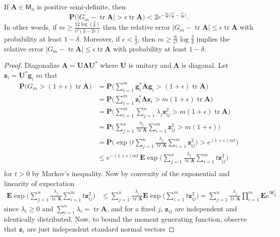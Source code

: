\documentclass[10pt,letterpaper]{siamart171218}
\theoremstyle{definition}
\theoremstyle{remark}
\newcommand\M{\mathsf{M}}
\renewcommand\P{\mathbf{P}}
\newcommand\E{\mathbf{E}}
\newcommand\tr{\operatorname{tr}}
\newcommand\A{\boldsymbol{A}}
\newcommand\U{\boldsymbol{U}}
\renewcommand\L{\boldsymbol{\Lambda}}
\newcommand\z{\boldsymbol{z}}
\newcommand\g{\boldsymbol{g}}
\begin{document}
\begin{theorem}\label{thm:gauss}
    If $\A\in\M_n$ is positive semi-definite, then
    \[
        \P\bigl(|G_m - \tr\A| > \epsilon\tr\A\bigr) < 2e^{-\tfrac{m}{2}\bigl(\tfrac{\epsilon^2}{2} - \tfrac{\epsilon^3}{3}\bigr)}.
    \]
    In other words, if $m \geq \tfrac{12\log(\tfrac{2}{\delta})}{\epsilon^2(3-2\epsilon)}$ then
    the relative error $|G_m - \tr\A| \leq \epsilon\tr\A$ with probability at least $1-\delta$.
    Moreover, if $\epsilon < \tfrac{1}{2}$, then $m \geq \tfrac{6}{\epsilon^2}\log\tfrac{2}{\delta}$
    implies the relative error $|G_m - \tr\A| \leq \epsilon\tr\A$ with probability at least $1-\delta$.
\end{theorem}

\begin{proof}
    Diagonalize $\A = \U\L\U^*$ where $\U$ is unitary and $\L$ is diagonal. Let
    $\z_i = \U^*\g_i$ so that
    \begin{align*}
        \P\bigl(G_m > (1+\epsilon)\tr\A\bigr) &= \P\biggl(\sum_{i=1}^m \g_i^*\A\g_i > (1+\epsilon)\tr\A\biggr)\\
        &= \P\biggl(\sum_{i=1}^m \z_i^* \L\z_i > m(1+\epsilon)\tr\A\biggr)\\
        &= \P\biggl(\sum_{i=1}^m \sum_{j=1}^n \lambda_j \z_{ij}^2 > m(1+\epsilon)\tr\A\biggr)\\
        &= \P\biggl(\sum_{j=1}^n\frac{\lambda_j}{\tr\A}\sum_{i=1}^m \z_{ij}^2 > m(1+\epsilon)\biggr)\\
        &= \P\biggl(\exp\biggl(t\sum_{j=1}^n\frac{\lambda_j}{\tr\A}\sum_{i=1}^m \z_{ij}^2\biggr) > e^{(1+\epsilon)mt}\biggr)\\
        &\leq e^{-(1+\epsilon)mt}\,\E\exp\biggl(\sum_{j=1}^n\frac{\lambda_j}{\tr\A}\sum_{i=1}^m t\z_{ij}^2\biggr)\\
    \end{align*}
    for $t>0$ by Markov's inequality. \citep[Thm\,4.1]{wasserman2013all}
    Now by convexity of the exponential and linearity of expectation
    \begin{align*}
        \E\exp\biggl(\sum_{j=1}^n\frac{\lambda_j}{\tr\A}\sum_{i=1}^m t\z_{ij}^2\biggr) &\leq \sum_{j=1}^n \frac{\lambda_j}{\tr\A}\E\exp\biggl(\sum_{i=1}^m t \z_{ij}^2\biggr) = \sum_{j=1}^n \frac{\lambda_j}{\tr\A}\prod_{i=1}^m \E e^{t\z_{ij}^2}
    \end{align*}
    since $\lambda_i \geq 0$ and $\sum_{i=1}^n \lambda_i = \tr\A$, and for a fixed
    $j$, $\z_{ij}$ are independent and identically distributed. Now, to bound the moment
    generating function, observe that $\z_i$ are just independent standard normal vectors

\end{proof}
\end{document}
